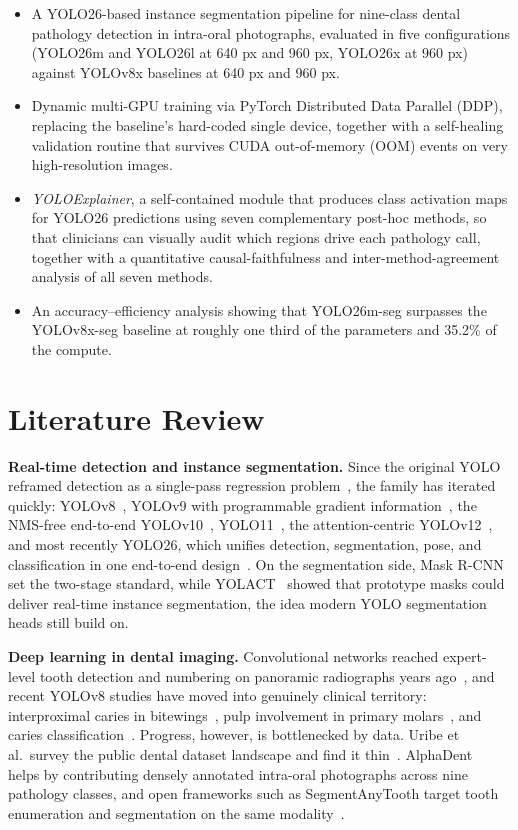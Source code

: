 \documentclass[conference]{IEEEtran}
\begin{document}
\begin{itemize}
\item A YOLO26-based instance segmentation pipeline for nine-class dental pathology detection in intra-oral photographs, evaluated in five configurations (YOLO26m and YOLO26l at 640 px and 960 px, YOLO26x at 960 px) against YOLOv8x baselines at 640 px and 960 px.
\item Dynamic multi-GPU training via PyTorch Distributed Data Parallel (DDP), replacing the baseline's hard-coded single device, together with a self-healing validation routine that survives CUDA out-of-memory (OOM) events on very high-resolution images.
\item \textit{YOLOExplainer}, a self-contained module that produces class activation maps for YOLO26 predictions using seven complementary post-hoc methods, so that clinicians can visually audit which regions drive each pathology call, together with a quantitative causal-faithfulness and inter-method-agreement analysis of all seven methods.
\item An accuracy--efficiency analysis showing that YOLO26m-seg surpasses the YOLOv8x-seg baseline at roughly one third of the parameters and 35.2\% of the compute.
\end{itemize}

\section{Literature Review}
\textbf{Real-time detection and instance segmentation.} Since the original YOLO reframed detection as a single-pass regression problem~\cite{redmon2016yolo}, the family has iterated quickly: YOLOv8~\cite{jocher2023ultralytics}, YOLOv9 with programmable gradient information~\cite{wang2024yolov9}, the NMS-free end-to-end YOLOv10~\cite{wang2024yolov10}, YOLO11~\cite{ultralytics2024yolo11}, the attention-centric YOLOv12~\cite{tian2025yolov12}, and most recently YOLO26, which unifies detection, segmentation, pose, and classification in one end-to-end design~\cite{jocher2026yolo26}. On the segmentation side, Mask R-CNN~\cite{he2017maskrcnn} set the two-stage standard, while YOLACT~\cite{bolya2019yolact} showed that prototype masks could deliver real-time instance segmentation, the idea modern YOLO segmentation heads still build on.

\textbf{Deep learning in dental imaging.} Convolutional networks reached expert-level tooth detection and numbering on panoramic radiographs years ago~\cite{tuzoff2019tooth}, and recent YOLOv8 studies have moved into genuinely clinical territory: interproximal caries in bitewings~\cite{bayati2025advanced}, pulp involvement in primary molars~\cite{sohrabi2025deep}, and caries classification~\cite{agulan2024detection}. Progress, however, is bottlenecked by data. Uribe et al.\ survey the public dental dataset landscape and find it thin~\cite{uribe2024public}. AlphaDent~\cite{sosnin2025alphadent} helps by contributing densely annotated intra-oral photographs across nine pathology classes, and open frameworks such as SegmentAnyTooth target tooth enumeration and segmentation on the same modality~\cite{nguyen2025segmentanytooth}.
\end{document}
